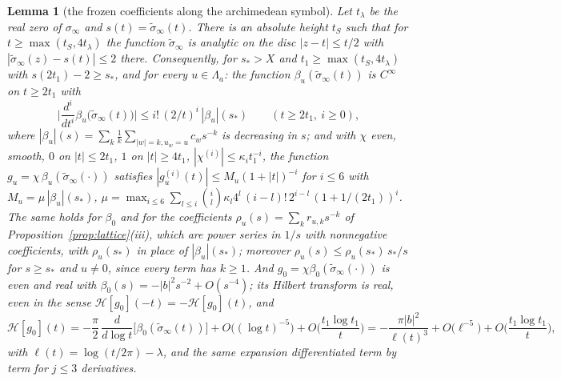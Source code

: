 \documentclass[11pt]{article}
\newtheorem{lemma}[theorem]{Lemma}
\theoremstyle{definition}
\theoremstyle{remark}
\begin{document}
\begin{lemma}[the frozen coefficients along the archimedean symbol]\label{lem:frozen}
Let $t_\lambda$ be the real zero of $\sigma_\infty$ and $s(t)=\tilde\sigma_\infty(t)$. There is an absolute height $t_S$ such that for $t\ge\max(t_S,4t_\lambda)$ the function $\tilde\sigma_\infty$ is analytic on the disc $|z-t|\le t/2$ with $|\tilde\sigma_\infty(z)-s(t)|\le2$ there. Consequently, for $s_*>X$ and $t_1\ge\max(t_S,4t_\lambda)$ with $s(2t_1)-2\ge s_*$, and for every $u\in\Lambda_a$: the function $\beta_u(\tilde\sigma_\infty(t))$ is $C^\infty$ on $t\ge2t_1$ with
\[
\Big|\frac{d^i}{dt^i}\beta_u\big(\tilde\sigma_\infty(t)\big)\Big|\le i!\,(2/t)^i\,|\beta_u|(s_*)\qquad(t\ge2t_1,\ i\ge0),
\]
where $|\beta_u|(s)=\sum_k\frac1k\sum_{|w|=k,u_w=u}c_ws^{-k}$ is decreasing in $s$; and with $\chi$ even, smooth, $0$ on $|t|\le2t_1$, $1$ on $|t|\ge4t_1$, $|\chi^{(i)}|\le\kappa_i t_1^{-i}$, the function $g_u=\chi\,\beta_u(\tilde\sigma_\infty(\cdot))$ satisfies $|g_u^{(i)}(t)|\le M_u(1+|t|)^{-i}$ for $i\le6$ with $M_u=\mu\,|\beta_u|(s_*)$, $\mu=\max_{i\le6}\sum_{l\le i}\binom il\kappa_l4^l\,(i-l)!\,2^{i-l}\,(1+1/(2t_1))^i$. The same holds for $\beta_0$ and for the coefficients $\rho_u(s)=\sum_kr_{u,k}s^{-k}$ of Proposition~\ref{prop:lattice}(iii), which are power series in $1/s$ with nonnegative coefficients, with $\rho_u(s_*)$ in place of $|\beta_u|(s_*)$; moreover $\rho_u(s)\le\rho_u(s_*)\,s_*/s$ for $s\ge s_*$ and $u\ne0$, since every term has $k\ge1$. And $g_0=\chi\beta_0(\tilde\sigma_\infty(\cdot))$ is even and real with $\beta_0(s)=-|b|^2s^{-2}+O(s^{-4})$; its Hilbert transform is real, even in the sense $\mathcal H[g_0](-t)=-\mathcal H[g_0](t)$, and
\[
\mathcal H[g_0](t)=-\frac{\pi}{2}\,\frac{d}{d\log t}\big[\beta_0(\tilde\sigma_\infty(t))\big]+O\big((\log t)^{-5}\big)+O\Big(\frac{t_1\log t_1}{t}\Big)=-\frac{\pi|b|^2}{\ell(t)^3}+O\big(\ell^{-5}\big)+O\Big(\frac{t_1\log t_1}t\Big),
\]
with $\ell(t)=\log(t/2\pi)-\lambda$, and the same expansion differentiated term by term for $j\le3$ derivatives.
\end{lemma}
\end{document}

